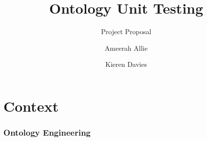 \documentclass[17pt,mathserif]{beamer}
\begin{document}
\title{Ontology Unit Testing}
\subtitle{Project Proposal}
\author{Ameerah Allie \and Kieren Davies}
\date{}
\titlepage


\section{Context}

\begin{frame}
  \frametitle{Ontology Engineering}
\end{frame}
\end{document}

